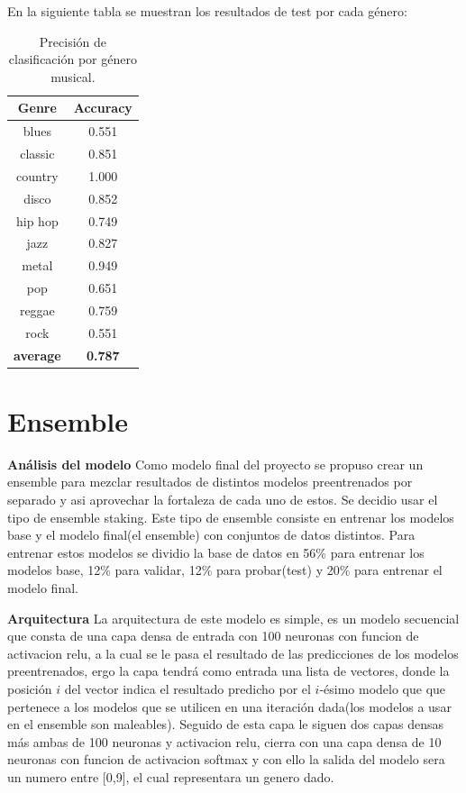 \documentclass[colorinlistoftodos,twoside,twocolumn,10pt]{article} %
\begin{document}
En la siguiente tabla se muestran los resultados de test por cada g\'enero:
\begin{table}[h]
\centering
\begin{tabular}{|c|c|}
\hline
\textbf{Genre} & \textbf{Accuracy} \\ \hline
blues & 0.551 \\ \hline
classic & 0.851 \\ \hline
country & 1.000 \\ \hline
disco & 0.852 \\ \hline
hip hop & 0.749 \\ \hline
jazz & 0.827 \\ \hline
metal & 0.949 \\ \hline
pop & 0.651 \\ \hline
reggae & 0.759 \\ \hline
rock & 0.551 \\ \hline
\textbf{average} & \textbf{0.787} \\ \hline
\end{tabular}
\caption{Precisión de clasificación por género musical.}
\label{tabla:1}
\end{table}

\section{Ensemble}
\textbf{\large An\'alisis del modelo}
Como modelo final del proyecto se propuso crear un ensemble para mezclar resultados de distintos modelos preentrenados por separado y asi aprovechar la fortaleza de cada uno de estos. Se decidio usar el tipo de ensemble staking. Este tipo de ensemble consiste en entrenar los modelos base y el modelo final(el ensemble) con conjuntos de datos distintos. Para entrenar estos modelos se dividio la base de datos en 56\% para entrenar los modelos base, 12\% para validar, 12\% para probar(test) y 20\% para entrenar el modelo final.

\textbf{\large Arquitectura}
La arquitectura de este modelo es simple, es un modelo secuencial que consta de una capa densa de entrada con 100 neuronas con funcion de activacion relu, a la cual se le pasa el resultado de las predicciones de los modelos preentrenados, ergo la capa tendr\'a como entrada una lista de vectores, donde la posici\'on $i$ del vector indica el resultado predicho por el $i$-\'esimo modelo que que pertenece a los modelos que se utilicen en una iteraci\'on dada(los modelos a usar en el ensemble son maleables).
Seguido de esta capa le siguen dos capas densas m\'as ambas de 100 neuronas y activacion relu, cierra con una capa densa de 10 neuronas con funcion de activacion softmax y con ello la salida del modelo sera un numero entre [0,9], el cual representara un genero dado.
\end{document}

